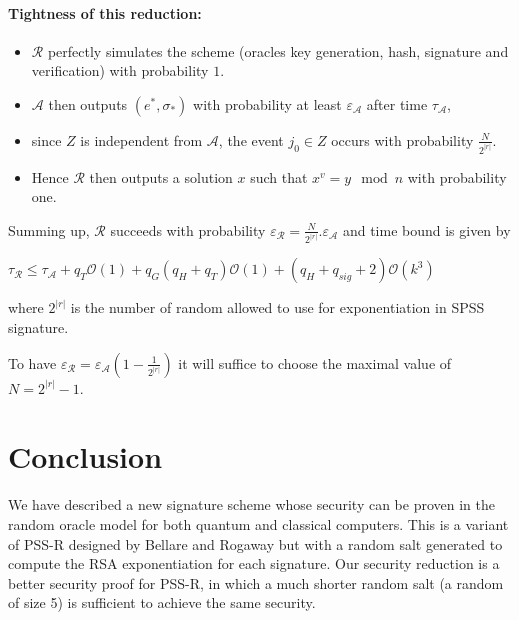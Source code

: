 \documentclass[a4paper,11pt]{article}
\begin{document}
\paragraph{Tightness of this reduction:}
\begin{itemize}
 \item  $\mathcal{R}$ perfectly simulates the scheme (oracles key generation,  hash, signature and verification) with probability $1$.
 \item $\mathcal{A}$ then outputs  $(e^{*}, \sigma_{*}) $ with probability at least  $\varepsilon_{\mathcal{A}}$
after time $\tau_{\mathcal{A}}$,
 \item  since $Z$ is independent from $\mathcal{A}$, the event $j_{0} \in Z $ occurs with probability $\frac{N}{2^{|r|}}$.
\item Hence $\mathcal{R}$ then outputs a solution $x$ such that $x^{v} = y \mod n$ with probability one.
 \end{itemize}
Summing up, $\mathcal{R}$ succeeds with probability $\varepsilon_{\mathcal{R}} = \frac{N}{2^{|r|}}.\varepsilon_{\mathcal{A}} $
  and time bound is given by
  
  \vspace{0.2cm}
  
   $\tau_{\mathcal{R}}\leq \tau_{\mathcal{A}} + q_{T}\mathcal{O}(1) + q_{G}(q_{H}+q_{T})\mathcal{O}(1)+ (q_{H}+q_{sig}+2)\mathcal{O}(k^{3})$
   
   \vspace{0.2cm}
   
 where $2^{|r|}$ is the number of random allowed to use for exponentiation in SPSS signature.

To have $\varepsilon_{\mathcal{R}} = \varepsilon_{\mathcal{A}}(1-\frac{1}{2^{|r|}}) $ it will suffice to choose the maximal value of $N=2^{|r|}-1$.
\section{Conclusion}
We have described a new signature scheme whose security can be proven in the random oracle model for both quantum and classical computers. This is a variant of PSS-R designed by Bellare and Rogaway but with a random salt generated to compute the RSA exponentiation for each signature. Our security reduction is a better security proof for PSS-R, in which a much shorter random salt (a random of size 5) is sufficient to achieve the same security. 
\end{document}
